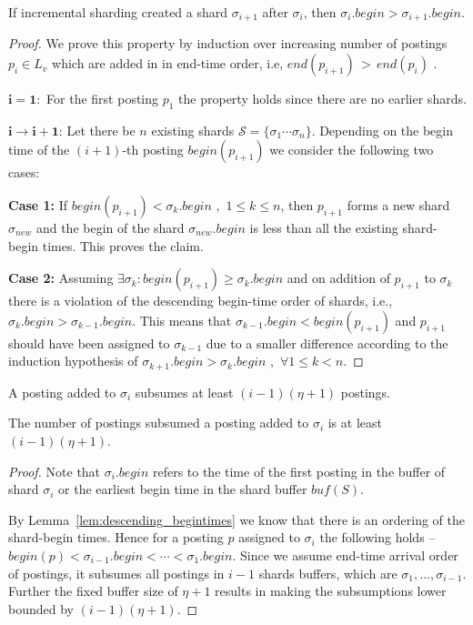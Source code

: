 \begin{lemma}
\label{lem:descending_begintimes}
If incremental sharding created a shard $\sigma_{i+1}$ after $\sigma_i$, then $\sigma_i.begin > \sigma_{i+1}.begin$.
\end{lemma}
\begin{proof}{}
	We prove this property by induction over increasing number of postings $p_i \in L_v$ which are added in in end-time order, i.e, $end(p_{i+1}) \, > \, end(p_{i})$ .

	$\mathbf{i = 1:}$ For the first posting $p_1$ the property holds since there are no earlier shards.

	$\mathbf{i \rightarrow i+1}$: Let there be $n$ existing shards $\mathcal{S} = \{ \sigma_1 \cdots \sigma_n \}$. Depending on the begin time of the $(i+1)$-th posting $begin(p_{i+1})$ we consider the following two cases:

	\textbf{Case 1:} If $begin(p_{i+1}) < \sigma_k.begin \,\, , \,\, 1 \le k \le n$, then $p_{i+1}$ forms a new shard $\sigma_{new}$ and the begin of the shard $\sigma_{new}.begin$ is less than all the existing shard-begin times. This proves the claim.

	\textbf{Case 2:} Assuming $\exists \sigma_k : begin(p_{i+1}) \geq \sigma_k.begin$ and on addition of $p_{i+1}$ to $\sigma_k$ there is a violation of the descending begin-time order of shards, i.e., $\sigma_k.begin > \sigma_{k-1}.begin$. This means that $\sigma_{k-1}.begin < begin(p_{i+1})$ and $p_{i+1}$ should have been assigned to $\sigma_{k-1}$ due to a smaller difference according to the induction hypothesis of $\sigma_{k+1}.begin > \sigma_{k}.begin\,\,, \,\,\forall 1 \le k < n$.
\end{proof}

\begin{lemma}
\label{lem:incremental_subsumption}
	A posting added to $\sigma_i$ subsumes at least $(i-1)(\eta + 1)$ postings.
\end{lemma}


\begin{lemma}
\label{lem:incremental_subsumption}
	The number of postings subsumed a posting added to $\sigma_i$ is at least $(i-1)(\eta + 1)$.
\end{lemma}

\begin{proof}{}
	Note that $\sigma_i.begin$ refers to the time of the first posting in the buffer of shard $\sigma_i$ or the earliest begin time in the shard buffer $buf(S)$. 
	
	By Lemma~\ref{lem:descending_begintimes} we know that there is an ordering of the shard-begin times. Hence for a posting $p$ assigned to $\sigma_i$ the following holds -- $begin(p) < \sigma_{i-1}.begin < \cdots < \sigma_1.begin$. Since we assume end-time arrival order of postings, it subsumes all postings in $i-1$ shards buffers, which are $\sigma_1,...,\sigma_{i-1}$. Further the fixed buffer size of $\eta+1$ results in making the subsumptions lower bounded by $(i-1)(\eta + 1)$.\end{proof}

